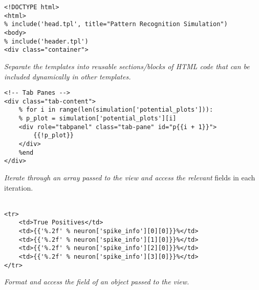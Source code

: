 \documentclass[a4paper,11pt]{article}
\begin{document}
\begin{verbatim}
<!DOCTYPE html>
<html>
% include('head.tpl', title="Pattern Recognition Simulation")
<body>
% include('header.tpl')
<div class="container">
\end{verbatim}
\textit{Separate the templates into reusable sections/blocks of HTML code that can be included dynamically in other templates.}    
\newpage 


\begin{verbatim}
<!-- Tab Panes -->
<div class="tab-content">
    % for i in range(len(simulation['potential_plots'])):
    % p_plot = simulation['potential_plots'][i]
    <div role="tabpanel" class="tab-pane" id="p{{i + 1}}">
        {{!p_plot}}
    </div>
    %end
</div>
\end{verbatim}
\textit{Iterate through an array passed to the view and access the relevant} fields in each iteration.
\\
\\

\begin{verbatim}
<tr>
    <td>True Positives</td>
    <td>{{'%.2f' % neuron['spike_info'][0][0]}}%</td>
    <td>{{'%.2f' % neuron['spike_info'][1][0]}}%</td>
    <td>{{'%.2f' % neuron['spike_info'][2][0]}}%</td>
    <td>{{'%.2f' % neuron['spike_info'][3][0]}}%</td>
</tr>
  \end{verbatim}
\textit{Format and access the field of an object passed to the view.}
\end{document}
